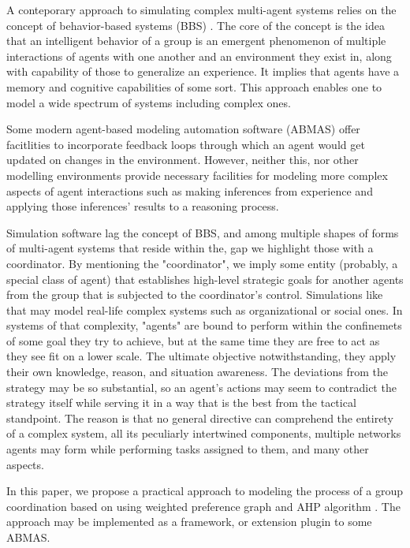 A conteporary approach to simulating complex multi-agent systems relies on the concept of 
behavior-based systems (BBS) \cite{mataric-1992}. The core of the concept is the idea that an 
intelligent behavior of a group is an emergent phenomenon of multiple interactions of agents with 
one another and an environment they exist in, along with capability of those to generalize an 
experience. It implies that agents have a memory and cognitive capabilities of some 
sort. This approach enables one to model a wide spectrum of systems including complex ones.

Some modern agent-based modeling automation software (ABMAS) offer facitlities to incorporate 
feedback loops through which an agent would get updated on changes in the environment. However, neither this, nor other modelling environments provide necessary 
facilities for modeling more complex aspects of agent interactions such as making inferences from 
experience and applying those inferences' results to a reasoning process.

Simulation software lag the concept of BBS, and among multiple shapes of forms of multi-agent 
systems that reside within the, gap we highlight those with a coordinator. By mentioning the 
"coordinator", we imply some entity (probably, a special class of agent) that establishes high-level 
strategic goals for another agents from the group that is subjected to the coordinator's control. 
Simulations like that may model real-life complex systems such as organizational or social ones. In 
systems of that complexity, "agents" are bound to perform within the confinemets of some goal they 
try to achieve, but at the same time they are free to act as they see fit on a lower scale. The 
ultimate objective notwithstanding, they apply their own knowledge, reason, and situation awareness. 
The deviations from the strategy may be so substantial, so an agent's actions may seem to contradict 
the strategy itself while serving it in a way that is the best from the tactical standpoint. The 
reason is that no general directive can comprehend the entirety of a complex system, all its 
peculiarly intertwined components, multiple networks agents may form while performing tasks assigned 
to them, and many other aspects.

In this paper, we propose a practical approach to modeling the process of a group coordination based 
on using weighted preference graph and AHP algorithm \cite{saaty1990decision}. The approach may be 
implemented as a framework, or extension plugin to some ABMAS.

